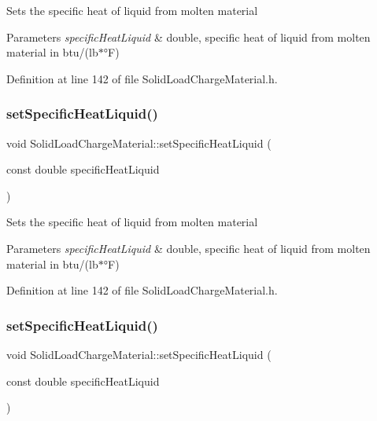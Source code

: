 Sets the specific heat of liquid from molten material 
\begin{DoxyParams}{Parameters}
{\em specific\+Heat\+Liquid} & double, specific heat of liquid from molten material in btu/(lb$\ast$°F) \\
\hline
\end{DoxyParams}


Definition at line 142 of file Solid\+Load\+Charge\+Material.\+h.

\mbox{\label{class_solid_load_charge_material_a91fad347bf52a4f6695c304904091797}} 
\subsubsection{\texorpdfstring{set\+Specific\+Heat\+Liquid()}{setSpecificHeatLiquid()}\hspace{0.1cm}{\footnotesize\ttfamily [2/3]}}
{\footnotesize\ttfamily void Solid\+Load\+Charge\+Material\+::set\+Specific\+Heat\+Liquid (\begin{DoxyParamCaption}\item[{const double}]{specific\+Heat\+Liquid }\end{DoxyParamCaption})\hspace{0.3cm}{\ttfamily [inline]}}

Sets the specific heat of liquid from molten material 
\begin{DoxyParams}{Parameters}
{\em specific\+Heat\+Liquid} & double, specific heat of liquid from molten material in btu/(lb$\ast$°F) \\
\hline
\end{DoxyParams}


Definition at line 142 of file Solid\+Load\+Charge\+Material.\+h.

\mbox{\label{class_solid_load_charge_material_a91fad347bf52a4f6695c304904091797}} 
\subsubsection{\texorpdfstring{set\+Specific\+Heat\+Liquid()}{setSpecificHeatLiquid()}\hspace{0.1cm}{\footnotesize\ttfamily [3/3]}}
{\footnotesize\ttfamily void Solid\+Load\+Charge\+Material\+::set\+Specific\+Heat\+Liquid (\begin{DoxyParamCaption}\item[{const double}]{specific\+Heat\+Liquid }\end{DoxyParamCaption})\hspace{0.3cm}{\ttfamily [inline]}}

